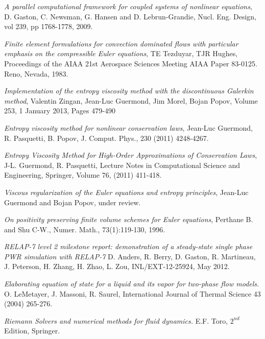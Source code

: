 \documentclass[12pt]{article}
\begin{document}
\begin{thebibliography}{10}
    
  \emph{A parallel computational framework for coupled systems of nonlinear equations},
  D. Gaston, C. Newsman, G. Hansen and D. Lebrun-Grandie, Nucl. Eng. Design, vol 239, pp 1768-1778, 2009.
  
  \emph{Finite element formulations for convection dominated flows with particular emphasis on the compressible Euler equations},
  TE Tezduyar, TJR Hughes, Proceedings of the AIAA 21st Aerospace Sciences Meeting AIAA Paper 83-0125. Reno, Nevada, 1983.
  
  \emph{Implementation of the entropy viscosity method with the discontinuous Galerkin method},
  Valentin Zingan, Jean-Luc Guermond, Jim Morel, Bojan Popov, Volume 253, 1 January 2013, Pages 479-490
  
  {\em Entropy viscosity method for nonlinear conservation laws}, 
  Jean-Luc Guermond, R. Pasquetti, B. Popov, J. Comput. Phys., 230 (2011) 4248-4267.
  
  {\em Entropy Viscosity Method for High-Order Approximations of Conservation Laws}, 
  J-L. Guermond, R. Pasquetti, 
  Lecture Notes in Computational Science and Engineering, Springer, Volume 76, (2011) 411-418.
  
  \emph{Viscous regularization of the Euler equations and entropy principles},
  Jean-Luc Guermond and Bojan Popov, under review.
  
  \emph{On positivity preserving finite volume schemes for Euler equations},
  Perthane B. and Shu C-W., Numer. Math., 73(1):119-130, 1996.
  
  \emph{RELAP-7 level 2 milestone report: demonstration of a steady-state single phase PWR simulation with RELAP-7}
  D. Anders, R. Berry, D. Gaston, R. Martineau, J. Peterson, H. Zhang, H. Zhao, L. Zou, INL/EXT-12-25924, May 2012.
  
  \emph{Elaborating equation of state for a liquid and its vapor for two-phase flow models.}
  O. LeMetayer, J. Massoni, R. Saurel, International Journal of Thermal Science 43 (2004) 265-276.

  \emph{Riemann Solvers and numerical methods for fluid dynamics.}
  E.F. Toro, $2^{nd}$ Edition, Springer.  
  
  
  \end{thebibliography}
\end{document}
